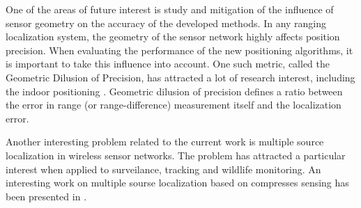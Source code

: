 One of the areas of future interest is study and mitigation of the influence of sensor geometry on the accuracy of the developed methods. In any ranging localization system, the geometry of the sensor network  highly affects position precision.   When evaluating the performance of the new positioning algorithms, it is important to  take this influence into account. One such metric, called the Geometric Dilusion of Precision, has attracted a lot of research interest, including the indoor positioning \cite{Sharp, Sharp2}. Geometric dilusion of precision defines a ratio between the error in range (or range-difference) measurement itself and the localization error.

Another interesting problem related to the current work is multiple source localization in wireless sensor networks. The problem has attracted a particular interest when applied to surveilance, tracking and wildlife monitoring. An interesting work on multiple sourse localization based on compresses sensing has been presented in \cite{LiuCS, LinCai}.



